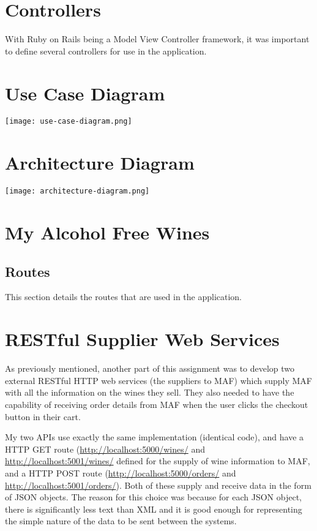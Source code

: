 \documentclass[a4paper,12pt,hidelinks]{report}
\begin{document}
    \section{Controllers}
    With Ruby on Rails being a Model View Controller framework, it was important to define several controllers for use in the application.

    \section{Use Case Diagram}
    \texttt{[image: use-case-diagram.png]}

    \section{Architecture Diagram}
    \texttt{[image: architecture-diagram.png]}

    \section{My Alcohol Free Wines}
    \subsection{Routes}
    This section details the routes that are used in the application.

    \section{RESTful Supplier Web Services}
    As previously mentioned, another part of this assignment was to develop two external RESTful HTTP web services (the suppliers to MAF) which
    supply MAF with all the information on the wines they sell. They also needed to have the capability of receiving order details from MAF when the
    user clicks the checkout button in their cart.

    My two APIs use exactly the same implementation (identical code), and have a HTTP GET route (\url{http://localhost:5000/wines/} and \url{http://localhost:5001/wines/} 
    defined for the supply of wine information to MAF, and a HTTP POST route (\url{http://localhost:5000/orders/} and \url{http://localhost:5001/orders/}).
    Both of these supply and receive data in the form of JSON objects. The reason for this choice was because for each JSON object, there is significantly less
    text than XML and it is good enough for representing the simple nature of the data to be sent between the systems.
\end{document}
